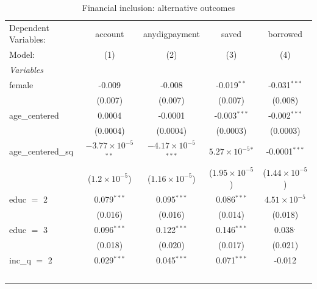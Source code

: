
\begin{table}[htbp]
   \caption{\label{tab:alternative_outcomes} Financial inclusion: alternative outcomes}
   \centering
   \begin{tabular}{lcccc}
      \tabularnewline \midrule \midrule
      Dependent Variables: & account                       & anydigpayment                  & saved                       & borrowed\\  
      Model:               & (1)                           & (2)                            & (3)                         & (4)\\  
      \midrule
      \emph{Variables}\\
      female               & -0.009                        & -0.008                         & -0.019$^{**}$               & -0.031$^{***}$\\   
                           & (0.007)                       & (0.007)                        & (0.007)                     & (0.008)\\   
      age\_centered        & 0.0004                        & -0.0001                        & -0.003$^{***}$              & -0.002$^{***}$\\   
                           & (0.0004)                      & (0.0004)                       & (0.0003)                    & (0.0003)\\   
      age\_centered\_sq    & $-3.77\times 10^{-5}$$^{**}$  & $-4.17\times 10^{-5}$$^{***}$  & $5.27\times 10^{-5}$$^{*}$  & -0.0001$^{***}$\\   
                           & ($1.2\times 10^{-5}$)         & ($1.16\times 10^{-5}$)         & ($1.95\times 10^{-5}$)      & ($1.44\times 10^{-5}$)\\    
      educ $=$ 2           & 0.079$^{***}$                 & 0.095$^{***}$                  & 0.086$^{***}$               & $4.51\times 10^{-5}$\\    
                           & (0.016)                       & (0.016)                        & (0.014)                     & (0.018)\\   
      educ $=$ 3           & 0.096$^{***}$                 & 0.122$^{***}$                  & 0.146$^{***}$               & 0.038$^{.}$\\   
                           & (0.018)                       & (0.020)                        & (0.017)                     & (0.021)\\   
      inc\_q $=$ 2         & 0.029$^{***}$                 & 0.045$^{***}$                  & 0.071$^{***}$               & -0.012\\   
$$
\end{tabular}
\end{table}
